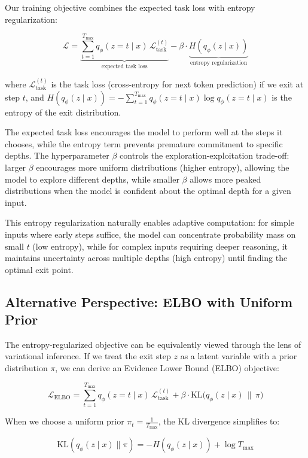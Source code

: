\documentclass[]{bytedance_seed}
\newcommand{\1}{\mathbf{1}}
\begin{document}
Our training objective combines the expected task loss with entropy regularization:

$$
\mathcal{L} = \underbrace{\sum_{t=1}^{T_{\max}} q_\phi(z=t \mid x)\, \mathcal{L}_{\text{task}}^{(t)}}_{\text{expected task loss}} - \beta \cdot \underbrace{H(q_\phi(z \mid x))}_{\text{entropy regularization}}
$$

where $\mathcal{L}_{\text{task}}^{(t)}$ is the task loss (cross-entropy for next token prediction) if we exit at step $t$, and $H(q_\phi(z \mid x)) = -\sum_{t=1}^{T_{\max}} q_\phi(z=t \mid x) \log q_\phi(z=t \mid x)$ is the entropy of the exit distribution.

The expected task loss encourages the model to perform well at the steps it chooses, while the entropy term prevents premature commitment to specific depths. The hyperparameter $\beta$ controls the exploration-exploitation trade-off: larger $\beta$ encourages more uniform distributions (higher entropy), allowing the model to explore different depths, while smaller $\beta$ allows more peaked distributions when the model is confident about the optimal depth for a given input.

This entropy regularization naturally enables adaptive computation: for simple inputs where early steps suffice, the model can concentrate probability mass on small $t$ (low entropy), while for complex inputs requiring deeper reasoning, it maintains uncertainty across multiple depths (high entropy) until finding the optimal exit point.

\subsection{Alternative Perspective: ELBO with Uniform Prior}

The entropy-regularized objective can be equivalently viewed through the lens of variational inference. If we treat the exit step $z$ as a latent variable with a prior distribution $\pi$, we can derive an Evidence Lower Bound (ELBO) objective:

$$
\mathcal{L}_{\text{ELBO}} = \sum_{t=1}^{T_{\max}} q_\phi(z=t \mid x)\, \mathcal{L}_{\text{task}}^{(t)} + \beta \cdot \mathrm{KL}\!\big(q_\phi(z \mid x)\, \| \,\pi\big)
$$

When we choose a uniform prior $\pi_t = \frac{1}{T_{\max}}$, the KL divergence simplifies to:

$$
\mathrm{KL}(q_\phi(z \mid x) \| \pi) = -H(q_\phi(z \mid x)) + \log T_{\max}
$$
\end{document}

